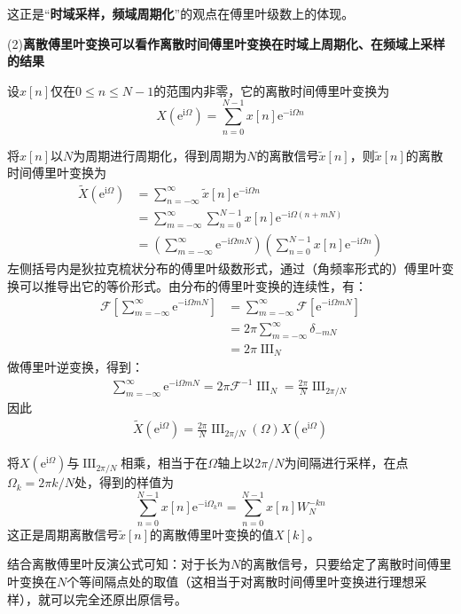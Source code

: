 \documentclass{ctexbook}
\newcommand{\shah}{\operatorname{III}}
\begin{document}
这正是“\textbf{时域采样，频域周期化}”的观点在傅里叶级数上的体现。

(2)\textbf{离散傅里叶变换可以看作离散时间傅里叶变换在时域上周期化、在频域上采样的结果}

设$x[n]$仅在$0\leq n\leq N-1$的范围内非零，它的离散时间傅里叶变换为
\[X(\mathrm{e}^{\mathrm{i}\Omega})=\sum_{n=0}^{N-1}x[n]\mathrm{e}^{-\mathrm{i}\Omega n}\]

将$x[n]$以$N$为周期进行周期化，得到周期为$N$的离散信号$\tilde{x}[n]$，则$\tilde{x}[n]$的离散时间傅里叶变换为
\begin{align*}
    \tilde{X}(\mathrm{e}^{\mathrm{i}\Omega})&=\sum_{n=-\infty}^{\infty}\tilde{x}[n]\mathrm{e}^{-\mathrm{i}\Omega n}\\
    &=\sum_{m=-\infty}^{\infty}\sum_{n=0}^{N-1}x[n]\mathrm{e}^{-\mathrm{i}\Omega (n+mN)}\\
    &=\left(\sum_{m=-\infty}^{\infty}\mathrm{e}^{-\mathrm{i}\Omega mN}\right)\left(\sum_{n=0}^{N-1}x[n]\mathrm{e}^{-\mathrm{i}\Omega n}\right)
\end{align*}
左侧括号内是狄拉克梳状分布的傅里叶级数形式，通过（角频率形式的）傅里叶变换可以推导出它的等价形式。由分布的傅里叶变换的连续性，有：
\begin{align*}
    \mathcal{F}\left[\sum_{m=-\infty}^{\infty}\mathrm{e}^{-\mathrm{i}\Omega mN}\right]&=\sum_{m=-\infty}^{\infty}\mathcal{F}\left[\mathrm{e}^{-\mathrm{i}\Omega mN}\right]\\
    &=2\pi\sum_{m=-\infty}^{\infty}\delta_{-mN}\\
    &=2\pi\shah_{N}
\end{align*}
做傅里叶逆变换，得到：\begin{align*}
    \sum_{m=-\infty}^{\infty}\mathrm{e}^{-\mathrm{i}\Omega mN}=2\pi\mathcal{F}^{-1}\shah_{N}=\frac{2\pi}{N}\shah_{2\pi/N}
\end{align*}
因此\begin{align*}
    \tilde{X}(\mathrm{e}^{\mathrm{i}\Omega})=\frac{2\pi}{N}\shah_{2\pi/N}(\Omega)X(\mathrm{e}^{\mathrm{i}\Omega})
\end{align*}

将$X(\mathrm{e}^{\mathrm{i}\Omega})$与$\shah_{2\pi/N}$相乘，相当于在$\Omega$轴上以$2\pi/N$为间隔进行采样，在点$\Omega_k=2\pi k/N$处，得到的样值为
$$\sum_{n=0}^{N-1}x[n]\mathrm{e}^{-\mathrm{i}\Omega_k n}=\sum_{n=0}^{N-1}x[n]W_N^{-kn}$$
这正是周期离散信号$\tilde{x}[n]$的离散傅里叶变换的值$X[k]$。

结合离散傅里叶反演公式可知：对于长为$N$的离散信号，只要给定了离散时间傅里叶变换在$N$个等间隔点处的取值（这相当于对离散时间傅里叶变换进行理想采样），就可以完全还原出原信号。
\end{document}
